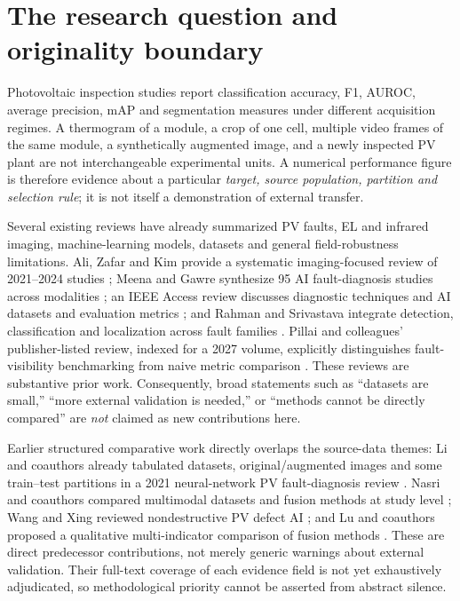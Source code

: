 \documentclass[10pt,a4paper]{article}
\begin{document}
\section{The research question and originality boundary}
Photovoltaic inspection studies report classification accuracy, F1, AUROC, average precision, mAP and segmentation measures under different acquisition regimes. A thermogram of a module, a crop of one cell, multiple video frames of the same module, a synthetically augmented image, and a newly inspected PV plant are not interchangeable experimental units. A numerical performance figure is therefore evidence about a particular \emph{target, source population, partition and selection rule}; it is not itself a demonstration of external transfer.

Several existing reviews have already summarized PV faults, EL and infrared imaging, machine-learning models, datasets and general field-robustness limitations. Ali, Zafar and Kim provide a systematic imaging-focused review of 2021--2024 studies \cite{ali2026}; Meena and Gawre synthesize 95 AI fault-diagnosis studies across modalities \cite{meena2026}; an IEEE Access review discusses diagnostic techniques and AI datasets and evaluation metrics \cite{ieee2026}; and Rahman and Srivastava integrate detection, classification and localization across fault families \cite{rahman2026}. Pillai and colleagues' publisher-listed review, indexed for a 2027 volume, explicitly distinguishes fault-visibility benchmarking from naive metric comparison \cite{pillai2027}. These reviews are substantive prior work. Consequently, broad statements such as ``datasets are small,'' ``more external validation is needed,'' or ``methods cannot be directly compared'' are \emph{not} claimed as new contributions here.

Earlier structured comparative work directly overlaps the source-data themes: Li and coauthors already tabulated datasets, original/augmented images and some train--test partitions in a 2021 neural-network PV fault-diagnosis review \cite{li2021}. Nasri and coauthors compared multimodal datasets and fusion methods at study level \cite{nasri2026}; Wang and Xing reviewed nondestructive PV defect AI \cite{wangxing2026}; and Lu and coauthors proposed a qualitative multi-indicator comparison of fusion methods \cite{lu2026}. These are direct predecessor contributions, not merely generic warnings about external validation. Their full-text coverage of each evidence field is not yet exhaustively adjudicated, so methodological priority cannot be asserted from abstract silence.
\end{document}
